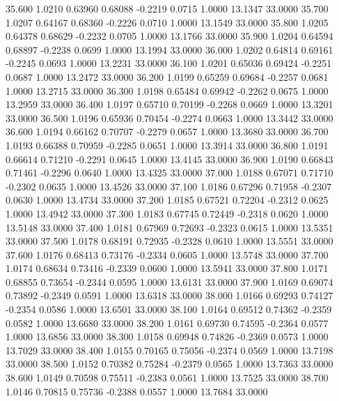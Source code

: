   35.600   1.0210   0.63960   0.68088  -0.2219   0.0715   1.0000  13.1347  33.0000
  35.700   1.0207   0.64167   0.68360  -0.2226   0.0710   1.0000  13.1549  33.0000
  35.800   1.0205   0.64378   0.68629  -0.2232   0.0705   1.0000  13.1766  33.0000
  35.900   1.0204   0.64594   0.68897  -0.2238   0.0699   1.0000  13.1994  33.0000
  36.000   1.0202   0.64814   0.69161  -0.2245   0.0693   1.0000  13.2231  33.0000
  36.100   1.0201   0.65036   0.69424  -0.2251   0.0687   1.0000  13.2472  33.0000
  36.200   1.0199   0.65259   0.69684  -0.2257   0.0681   1.0000  13.2715  33.0000
  36.300   1.0198   0.65484   0.69942  -0.2262   0.0675   1.0000  13.2959  33.0000
  36.400   1.0197   0.65710   0.70199  -0.2268   0.0669   1.0000  13.3201  33.0000
  36.500   1.0196   0.65936   0.70454  -0.2274   0.0663   1.0000  13.3442  33.0000
  36.600   1.0194   0.66162   0.70707  -0.2279   0.0657   1.0000  13.3680  33.0000
  36.700   1.0193   0.66388   0.70959  -0.2285   0.0651   1.0000  13.3914  33.0000
  36.800   1.0191   0.66614   0.71210  -0.2291   0.0645   1.0000  13.4145  33.0000
  36.900   1.0190   0.66843   0.71461  -0.2296   0.0640   1.0000  13.4325  33.0000
  37.000   1.0188   0.67071   0.71710  -0.2302   0.0635   1.0000  13.4526  33.0000
  37.100   1.0186   0.67296   0.71958  -0.2307   0.0630   1.0000  13.4734  33.0000
  37.200   1.0185   0.67521   0.72204  -0.2312   0.0625   1.0000  13.4942  33.0000
  37.300   1.0183   0.67745   0.72449  -0.2318   0.0620   1.0000  13.5148  33.0000
  37.400   1.0181   0.67969   0.72693  -0.2323   0.0615   1.0000  13.5351  33.0000
  37.500   1.0178   0.68191   0.72935  -0.2328   0.0610   1.0000  13.5551  33.0000
  37.600   1.0176   0.68413   0.73176  -0.2334   0.0605   1.0000  13.5748  33.0000
  37.700   1.0174   0.68634   0.73416  -0.2339   0.0600   1.0000  13.5941  33.0000
  37.800   1.0171   0.68855   0.73654  -0.2344   0.0595   1.0000  13.6131  33.0000
  37.900   1.0169   0.69074   0.73892  -0.2349   0.0591   1.0000  13.6318  33.0000
  38.000   1.0166   0.69293   0.74127  -0.2354   0.0586   1.0000  13.6501  33.0000
  38.100   1.0164   0.69512   0.74362  -0.2359   0.0582   1.0000  13.6680  33.0000
  38.200   1.0161   0.69730   0.74595  -0.2364   0.0577   1.0000  13.6856  33.0000
  38.300   1.0158   0.69948   0.74826  -0.2369   0.0573   1.0000  13.7029  33.0000
  38.400   1.0155   0.70165   0.75056  -0.2374   0.0569   1.0000  13.7198  33.0000
  38.500   1.0152   0.70382   0.75284  -0.2379   0.0565   1.0000  13.7363  33.0000
  38.600   1.0149   0.70598   0.75511  -0.2383   0.0561   1.0000  13.7525  33.0000
  38.700   1.0146   0.70815   0.75736  -0.2388   0.0557   1.0000  13.7684  33.0000
